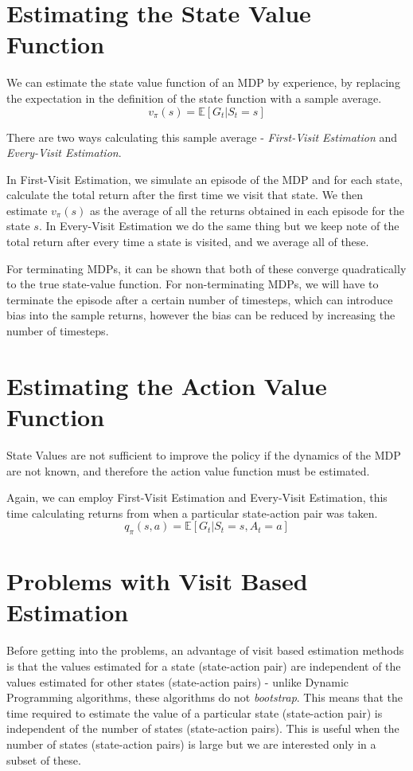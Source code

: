 \documentclass[12pt]{report}
\begin{document}
\section{Estimating the State Value Function}
We can estimate the state value function of an MDP by experience, by replacing the expectation in the definition of the state function with a sample average.
\begin{equation}
    v_{\pi}(s) = \mathbb{E}[G_{t} | S_{t} = s]
\end{equation}

There are two ways calculating this sample average - \textit{First-Visit Estimation} and \textit{Every-Visit Estimation}. 

In First-Visit Estimation, we simulate an episode of the MDP and for each state, calculate the total return after the first time we visit that state. We then estimate $v_{\pi}(s)$ as the average of all the returns obtained in each episode for the state $s$. In Every-Visit Estimation we do the same thing but we keep note of the total return after every time a state is visited, and we average all of these.

For terminating MDPs, it can be shown that both of these converge quadratically to the true state-value function. For non-terminating MDPs, we will have to terminate the episode after a certain number of timesteps, which can introduce bias into the sample returns, however the bias can be reduced by increasing the number of timesteps.

\section{Estimating the Action Value Function}
State Values are not sufficient to improve the policy if the dynamics of the MDP are not known, and therefore the action value function must be estimated.

Again, we can employ First-Visit Estimation and Every-Visit Estimation, this time calculating returns from when a particular state-action pair was taken.
\begin{equation}
    q_{\pi}(s, a) = \mathbb{E}[G_{t} | S_{t} = s, A_{t} = a]
\end{equation}

\section{Problems with Visit Based Estimation}
Before getting into the problems, an advantage of visit based estimation methods is that the values estimated for a state (state-action pair) are independent of the values estimated for other states (state-action pairs) - unlike Dynamic Programming algorithms, these algorithms do not \textit{bootstrap}. This means that the time required to estimate the value of a particular state (state-action pair) is independent of the number of states (state-action pairs). This is useful when the number of states (state-action pairs) is large but we are interested only in a subset of these.
\end{document}
